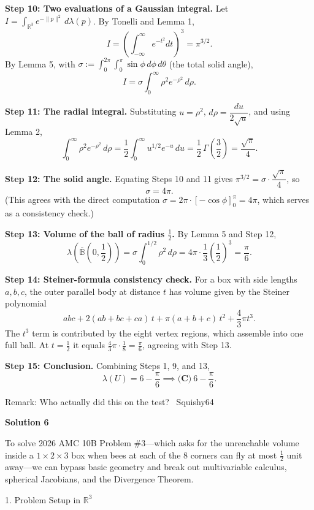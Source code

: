 \begin{enumerate}
 \textbf{Step 10: Two evaluations of a Gaussian integral.} Let $I=\int_{\mathbb{R}^3}e^{-\|p\|^2}\,d\lambda(p)$. By Tonelli and Lemma 1,
 \[I=\left(\int_{-\infty}^{\infty}e^{-t^2}dt\right)^3=\pi^{3/2}.\]By Lemma 5, with $\sigma:=\int_0^{2\pi}\!\!\int_0^{\pi}\sin\phi\,d\phi\,d\theta$ (the total solid angle),
 \[I=\sigma\int_0^\infty\rho^2e^{-\rho^2}\,d\rho.\]

 \textbf{Step 11: The radial integral.} Substituting $u=\rho^2$, $d\rho=\dfrac{du}{2\sqrt u}$, and using Lemma 2,
 \[\int_0^\infty\rho^2e^{-\rho^2}\,d\rho=\frac12\int_0^\infty u^{1/2}e^{-u}\,du=\frac12\,\Gamma\left(\frac32\right)=\frac{\sqrt{\pi}}{4}.\]

 \textbf{Step 12: The solid angle.} Equating Steps 10 and 11 gives $\pi^{3/2}=\sigma\cdot\dfrac{\sqrt{\pi}}{4}$, so
 \[\sigma=4\pi.\](This agrees with the direct computation $\sigma=2\pi\cdot\left[-\cos\phi\right]_0^{\pi}=4\pi$, which serves as a consistency check.)

 \textbf{Step 13: Volume of the ball of radius $\frac12$.} By Lemma 5 and Step 12,
 \[\lambda\left(\overline{\mathbb{B}}\left(0,\frac12\right)\right)=\sigma\int_0^{1/2}\rho^2\,d\rho=4\pi\cdot\frac13\left(\frac12\right)^3=\frac{\pi}{6}.\]

 \textbf{Step 14: Steiner-formula consistency check.} For a box with side lengths $a,b,c$, the outer parallel body at distance $t$ has volume given by the Steiner polynomial
 \[abc+2(ab+bc+ca)\,t+\pi(a+b+c)\,t^2+\frac43\pi t^3.\]The $t^3$ term is contributed by the eight vertex regions, which assemble into one full ball. At $t=\frac12$ it equals $\frac43\pi\cdot\frac18=\frac\pi6$, agreeing with Step 13.

 \textbf{Step 15: Conclusion.} Combining Steps 1, 9, and 13,
 \[\lambda(U)=6-\frac{\pi}{6}\implies\boxed{\textbf{(C)}\ 6-\frac{\pi}{6}}.\]

 Remark: Who actually did this on the test? ~Squishy64

 



\textbf{Solution 6}

To solve 2026 AMC 10B Problem \#3—which asks for the unreachable volume inside a \(1 \times 2 \times 3\) box when bees at each of the \(8\) corners can fly at most \(\frac{1}{2}\) unit away—we can bypass basic geometry and break out multivariable calculus, spherical Jacobians, and the Divergence Theorem.

 1. Problem Setup in \(\mathbb{R}^{3}\)


\end{enumerate}
